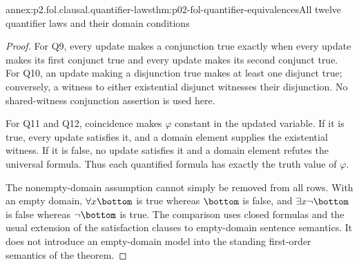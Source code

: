 \begin{annexitem}{annex:p2.fol.clausal.quantifier-laws}{thm:p02-fol-quantifier-equivalences}{All twelve quantifier laws and their domain conditions}
\begin{proof}
For Q9, every update makes a conjunction true exactly when every
update makes its first conjunct true and every update makes its
second conjunct true.  For Q10, an update making a disjunction true
makes at least one disjunct true; conversely, a witness to either
existential disjunct witnesses their disjunction.  No shared-witness
conjunction assertion is used here.

For Q11 and Q12, coincidence makes \(\varphi\) constant in
the updated variable.  If it is true, every update satisfies it,
and a domain element supplies the existential witness.  If it is
false, no update satisfies it and a domain element refutes the
universal formula.  Thus each quantified formula has exactly the
truth value of \(\varphi\).

The nonempty-domain assumption cannot simply be removed from all
rows.  With an empty domain, \(\forall x\bottom\) is true
whereas \(\bottom\) is false, and
\(\exists x\neg\bottom\) is false whereas
\(\neg\bottom\) is true.  The comparison uses closed formulas
and the usual extension of the satisfaction clauses to empty-domain
sentence semantics.  It does not introduce an empty-domain model
into the standing first-order semantics of the theorem.
\end{proof}
\end{annexitem}

